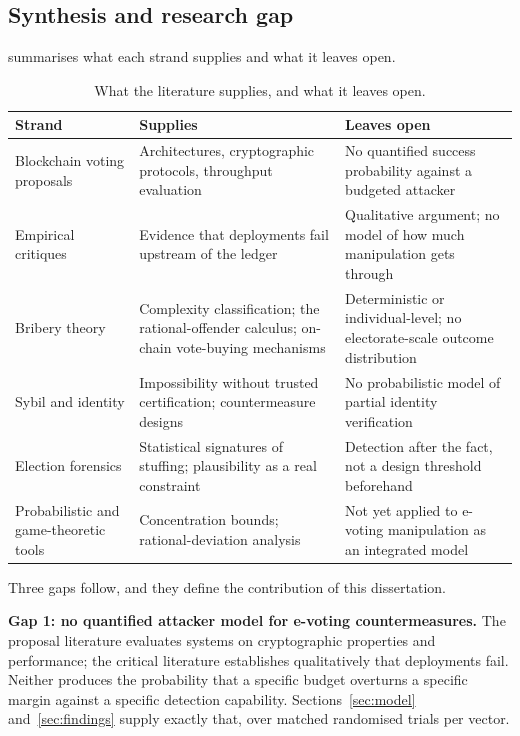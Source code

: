 \subsection{Synthesis and research gap}
\label{sec:lit-synthesis}

 summarises what each strand supplies and what it
leaves open.

\begin{table}[htbp]
\centering
\caption{What the literature supplies, and what it leaves open.}
\label{tab:gap}
\small
\begin{tabular}{@{}p{3.5cm}p{5.1cm}p{5.1cm}@{}}
\toprule
\textbf{Strand} & \textbf{Supplies} & \textbf{Leaves open} \\
\midrule
Blockchain voting proposals
  \cite{mccorry2017,ohize2025,rahul2025}
& Architectures, cryptographic protocols, throughput evaluation
& No quantified success probability against a budgeted attacker \\
\addlinespace
Empirical critiques
  \cite{springall2014,specter2020,park2021}
& Evidence that deployments fail upstream of the ledger
& Qualitative argument; no model of how much manipulation gets through \\
\addlinespace
Bribery theory
  \cite{faliszewski2009,becker1968,daian2018}
& Complexity classification; the rational-offender calculus; on-chain vote-buying mechanisms
& Deterministic or individual-level; no electorate-scale outcome distribution \\
\addlinespace
Sybil and identity
  \cite{douceur2002,borge2017}
& Impossibility without trusted certification; countermeasure designs
& No probabilistic model of partial identity verification \\
\addlinespace
Election forensics
  \cite{klimek2012}
& Statistical signatures of stuffing; plausibility as a real constraint
& Detection after the fact, not a design threshold beforehand \\
\addlinespace
Probabilistic and game-theoretic tools
  \cite{chernoff1952,mitzenmacher2017,eyal2014,liu2019}
& Concentration bounds; rational-deviation analysis
& Not yet applied to e-voting manipulation as an integrated model \\
\bottomrule
\end{tabular}
\end{table}

Three gaps follow, and they define the contribution of this
dissertation.

\textbf{Gap 1: no quantified attacker model for e-voting
countermeasures.} The proposal literature evaluates systems on
cryptographic properties and performance; the critical literature
establishes qualitatively that deployments fail. Neither produces the
probability that a specific budget overturns a specific margin against
a specific detection capability. Sections~\ref{sec:model}
and~\ref{sec:findings} supply exactly that, over
\TotalTrials{} matched randomised trials per vector.

